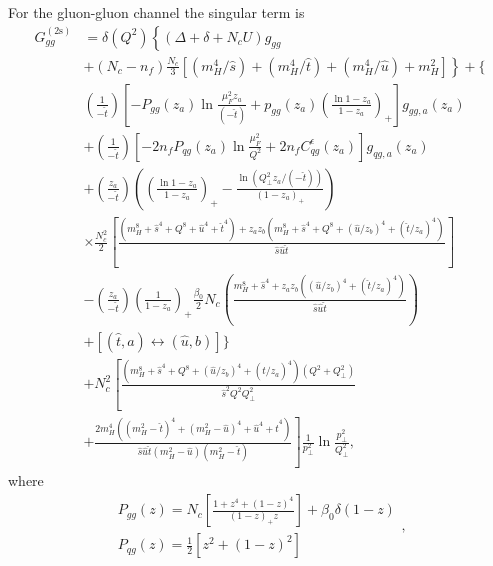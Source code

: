 \documentclass[10pt]{report}
\begin{document}
For the gluon-gluon channel the singular term is
\begin{equation}
\begin{aligned}
G_{g g}^{(\mathrm{2s})}&=\delta\left(Q^{2}\right)\left\{\left(\Delta+\delta+N_{c} U\right) g_{g g}\right.\\
&\left.+\left(N_{c}-n_{f}\right) \frac{N_{c}}{3}\left[\left(m_{H}^{4} / \hat{s}\right)+\left(m_{H}^{4} / \hat{t}\right)+\left(m_{H}^{4} / \hat{u}\right)+m_{H}^{2}\right]\right\}+\{\\
&\left(\frac{1}{-\hat{t}}\right)\left[-P_{g g}\left(z_{a}\right) \ln \frac{\mu_{F}^{2} z_{a}}{(-\hat{t})}+p_{g g}\left(z_{a}\right)\left(\frac{\ln 1-z_{a}}{1-z_{a}}\right)_{+}\right] g_{g g, a}\left(z_{a}\right) \\
&+\left(\frac{1}{-\hat{t}}\right)\left[-2 n_{f} P_{q g}\left(z_{a}\right) \ln \frac{\mu_{F}^{2}}{Q^{2}}+2 n_{f} C_{q g}^{\epsilon}\left(z_{a}\right)\right] g_{q g, a}\left(z_{a}\right) \\
&+\left(\frac{z_{a}}{-\hat{t}}\right)\left(\left(\frac{\ln 1-z_{a}}{1-z_{a}}\right)_{+}-\frac{\ln \left(Q_{\perp}^{2} z_{a} /(-\hat{t})\right)}{\left(1-z_{a}\right)_{+}}\right) \\
&\times \frac{N_{c}^{2}}{2}\left[\frac{\left(m_{H}^{8}+\hat{s}^{4}+Q^{8}+\hat{u}^{4}+\hat{t}^{4}\right)+z_{a} z_{b}\left(m_{H}^{8}+\hat{s}^{4}+Q^{8}+\left(\hat{u} / z_{b}\right)^{4}+\left(\hat{t} / z_{a}\right)^{4}\right)}{\hat{s} \hat{u} \hat{t}}\right] \\
&-\left(\frac{z_{a}}{-\hat{t}}\right)\left(\frac{1}{1-z_{a}}\right)_{+} \frac{\beta_{0}}{2} N_{c}\left(\frac{m_{H}^{8}+\hat{s}^{4}+z_{a} z_{b}\left(\left(\hat{u} / z_{b}\right)^{4}+\left(\hat{t} / z_{a}\right)^{4}\right)}{\hat{s} \hat{u} \hat{t}}\right) \\
&+[(\hat{t}, a) \leftrightarrow(\hat{u}, b)]\} \\
&+N_{c}^{2}\left[\frac{\left(m_{H}^{8}+\hat{s}^{4}+Q^{8}+\left(\hat{u} / z_{b}\right)^{4}+\left(\hat{t} / z_{a}\right)^{4}\right)\left(Q^{2}+Q_{\perp}^{2}\right)}{\hat{s}^{2} Q^{2} Q_{\perp}^{2}}\right.\\
&\left.+\frac{2 m_{H}^{4}\left(\left(m_{H}^{2}-\hat{t}\right)^{4}+\left(m_{H}^{2}-\hat{u}\right)^{4}+\hat{u}^{4}+\hat{t}^{4}\right)}{\hat{s} \hat{u} \hat{t}\left(m_{H}^{2}-\hat{u}\right)\left(m_{H}^{2}-\hat{t}\right)}\right] \frac{1}{p_{\perp}^{2}} \ln \frac{p_{\perp}^{2}}{Q_{\perp}^{2}},
\end{aligned}
\end{equation}
where 
\begin{equation}
\begin{array}{l}
P_{g g}(z)=N_{c}\left[\frac{1+z^{4}+(1-z)^{4}}{(1-z)_{+} z}\right]+\beta_{0} \delta(1-z) \\
P_{q g}(z)=\frac{1}{2}\left[z^{2}+(1-z)^{2}\right]
\end{array},
\end{equation}
\end{document}
